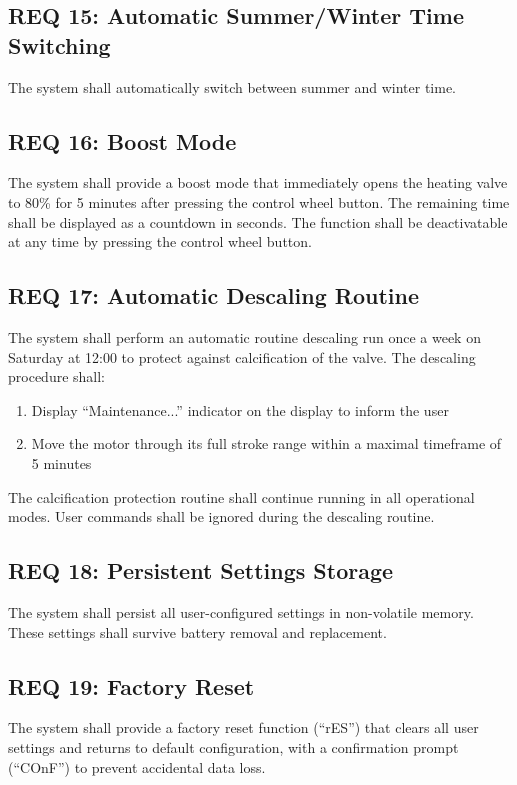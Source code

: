 \subsection*{REQ 15: Automatic Summer/Winter Time Switching}
\label{subsec:REQ 15: Automatic Summer/Winter Time Switching}
The system shall automatically switch between summer and winter time.

\subsection*{REQ 16: Boost Mode}
\label{subsec:REQ 16: Boost Mode}
The system shall provide a boost mode that immediately opens the heating valve to 80\% for 5 minutes after pressing the control wheel button. The remaining time shall be displayed as a countdown in seconds. The function shall be deactivatable at any time by pressing the control wheel button.

\subsection*{REQ 17: Automatic Descaling Routine}
\label{subsec:REQ 17: Automatic Descaling Routine}
The system shall perform an automatic routine descaling run once a week on Saturday at 12:00 to protect against calcification of the valve. The descaling procedure shall:
\begin{enumerate}
    \item Display ``Maintenance...'' indicator on the display to inform the user
    \item Move the motor through its full stroke range within a maximal timeframe of 5 minutes
\end{enumerate}
The calcification protection routine shall continue running in all operational modes. User commands shall be ignored during the descaling routine.

\subsection*{REQ 18: Persistent Settings Storage}
\label{subsec:REQ 18: Persistent Settings Storage}
The system shall persist all user-configured settings in non-volatile memory. These settings shall survive battery removal and replacement.

\subsection*{REQ 19: Factory Reset}
\label{subsec:REQ 19: Factory Reset}
The system shall provide a factory reset function (``rES'') that clears all user settings and returns to default configuration, with a confirmation prompt (``COnF'') to prevent accidental data loss.

